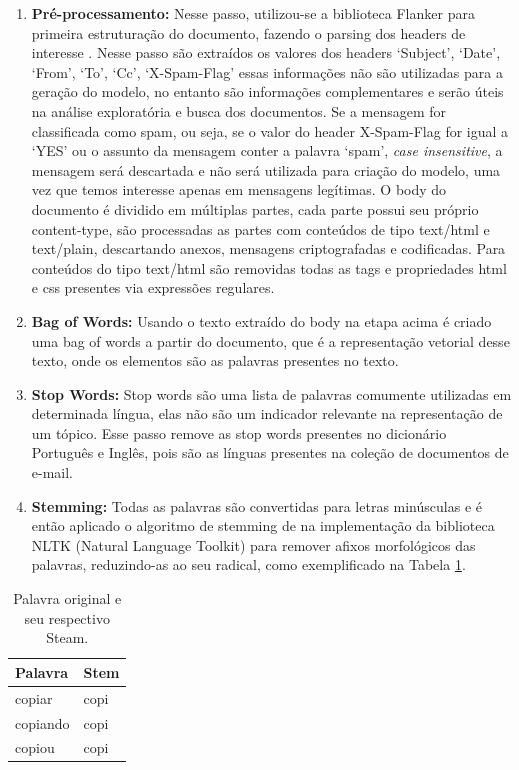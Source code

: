 \documentclass[12pt,a4paper]{article}
\begin{document}
\begin{enumerate}
\item \textbf{Pré-processamento:} Nesse passo, utilizou-se a biblioteca Flanker  para primeira estruturação do documento, fazendo o parsing dos headers de interesse \cite{flanker2017}. Nesse passo são extraídos os valores dos headers ‘Subject’, ‘Date’, ‘From’, ‘To’, ‘Cc’, ‘X-Spam-Flag’ essas informações não são utilizadas para a geração do modelo,
 no entanto são informações complementares e serão úteis na análise exploratória e busca dos documentos. Se a mensagem for classificada como spam, ou seja, 
 se o valor do header X-Spam-Flag for igual a ‘YES’ ou o assunto da mensagem conter a palavra ‘spam’, \textit{case insensitive}, a mensagem será descartada e não será utilizada para criação do modelo,
 uma vez que temos interesse apenas em mensagens legítimas. O body do documento é dividido em múltiplas partes, cada parte possui seu próprio content-type,
 são processadas as partes com conteúdos de tipo text/html e text/plain, descartando anexos, mensagens criptografadas e codificadas. 
 Para conteúdos do tipo text/html são removidas todas as tags e propriedades html e css presentes via expressões regulares.
\item \textbf{Bag of Words:} Usando o texto extraído do body na etapa acima é criado uma bag of words a partir do documento, que é a representação vetorial desse texto,
 onde os elementos são as palavras presentes no texto.
\item \textbf{Stop Words:} Stop words são uma lista de palavras comumente utilizadas em determinada língua, elas não são um indicador relevante na representação de um tópico.
 Esse passo remove as stop words presentes no dicionário Português e Inglês, pois são as línguas presentes na coleção de documentos de e-mail.
\item \textbf{Stemming:} Todas as palavras são convertidas para letras minúsculas e é então aplicado o algoritmo de stemming de 
 na implementação da biblioteca NLTK (Natural Language Toolkit)  para remover afixos morfológicos das palavras, reduzindo-as ao seu radical, como exemplificado na Tabela \ref{tab-stem}.

\end{enumerate}

\begin{table}[H]
  \centering
  \begin{tabular}{l l}
  Palavra		&Stem \\
  \hline
  copiar		&copi \\
  copiando		&copi \\
  copiou		&copi \\
  \hline
  \end{tabular}
  \caption{Palavra original e seu respectivo Steam.}
  \label{tab-stem}
\end{table}
\end{document}
